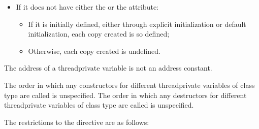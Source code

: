 \begin{fortranspecific}
\begin{itemize}
\item If it does not have either the  or the  
      attribute:

\begin{samepage}
\begin{itemize}
\item If it is initially defined, either through explicit initialization or default
      initialization, each copy created is so defined;
\item Otherwise, each copy created is undefined.
\end{itemize}
\end{samepage}
\end{itemize}
\end{fortranspecific}

\begin{ccppspecific}
The address of a threadprivate variable is not an address constant.
\end{ccppspecific}

\begin{cppspecific}
The order in which any constructors for different threadprivate variables 
of class type are called is unspecified. The order in which any destructors 
for different threadprivate variables of class type are called is unspecified.
\end{cppspecific}

\restrictions
The restrictions to the  directive are as follows:

